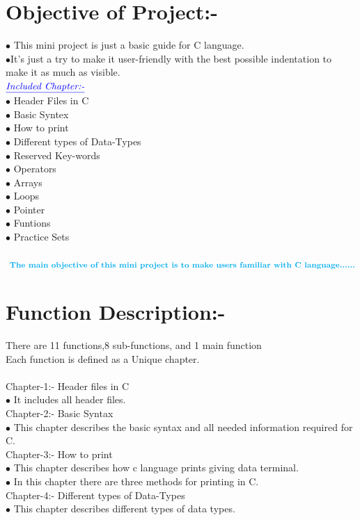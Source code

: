 \documentclass{article}
\begin{document}
\section{Objective of Project:-}

$\bullet${ This mini project is just a basic guide for C language.}\\
$\bullet${It's just a try to make it user-friendly with the best possible indentation to make it as much as visible.}\\
\vspace{10pt}
$\color{blue}{\\
\textit{\underline{Included Chapter:-}}}${\\
$\bullet$  Header Files in C\\
$\bullet$  Basic Syntex\\
$\bullet$  How to print\\
$\bullet$  Different types of Data-Types\\
$\bullet$  Reserved Key-words\\
$\bullet$  Operators\\
$\bullet$  Arrays\\
$\bullet$  Loops\\
$\bullet$  Pointer\\
$\bullet$  Funtions\\
$\bullet$  Practice Sets\\}
\\$\color{cyan}\textbf{ The main objective of this mini project is to make users familiar with C language......}$
\section{Function Description:-}
There are 11 functions,8 sub-functions, and 1 main function\\{\hspace{15pt}Each function is defined as a Unique chapter.}\\\\
{\color{red} Chapter-1:- Header files in C\\}
$\bullet$ It includes all header files.\\
{\color{red}Chapter-2:- Basic Syntax \\}
$\bullet$ This chapter describes the basic syntax and all needed information required for C.\\
{\color{red}Chapter-3:- How to print \\}
$\bullet$ This chapter describes how c language prints giving data terminal.\\
$\bullet$ In this chapter there are three methods for printing in C.\\
{\color{red}Chapter-4:- Different types of Data-Types\\}
$\bullet$ This chapter describes different types of data types.\\ 
\end{document}

